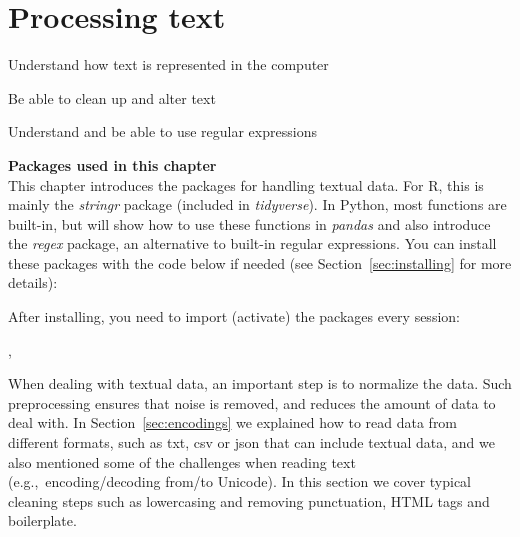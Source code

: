 \chapter{Processing text}
\label{chap:protext}


\begin{abstract}{Abstract}
Many datasets that are relevant for social science consist of textual data, from political discussions and newspaper archives to open-ended survey questions and reviews. This chapter gives an introduction to dealing with textual data using base functions in Python and (mostly) the \emph{stringr} package in R.
\end{abstract}


\begin{objectives}
\item Understand how text is represented in the computer
\item Be able to clean up and alter text
\item Understand and be able to use regular expressions
\end{objectives}


\newpage
\begin{feature}
  \textbf{Packages used in this chapter}\\
  This chapter introduces the packages for handling textual data.
  For R, this is mainly the \emph{stringr} package (included in \emph{tidyverse}).
  In Python, most functions are built-in, but will show how to use these functions in \emph{pandas} and also introduce the \emph{regex} package, an alternative to built-in regular expressions.
You can install these packages with the code below if needed  (see Section~\ref{sec:installing} for more details):


\noindent After installing, you need to import (activate) the packages every session:

,
\end{feature}

%

When dealing with textual data, an important step is to normalize the data. Such preprocessing ensures that noise is removed, and reduces the amount of data to deal with. In Section~\ref{sec:encodings} we explained how to read data from different formats, such as txt, csv or json that can include textual data, and we also mentioned some of the challenges when reading text (e.g.,\ encoding/decoding from/to Unicode). In this section we cover typical cleaning steps such as lowercasing and removing punctuation, HTML tags and boilerplate.

